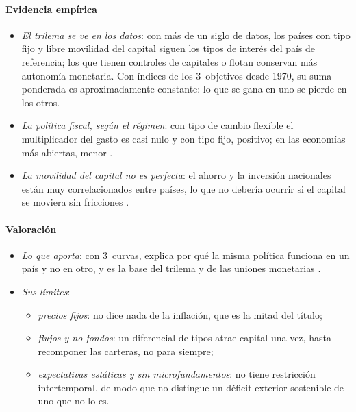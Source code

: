 \documentclass[11pt]{article}
\begin{document}
\paragraph{Evidencia empírica}

\begin{itemize}
\item \emph{El trilema se ve en los datos}: con más de un siglo de datos, los países con tipo fijo y libre movilidad del capital siguen los tipos de interés del país de referencia; los que tienen controles de capitales o flotan conservan más autonomía monetaria\nocite{ObstfeldShambaughTaylor2005}. Con índices de los 3~objetivos desde 1970, su suma ponderada es aproximadamente constante: lo que se gana en uno se pierde en los otros\nocite{AizenmanChinnIto2008}.
\item \emph{La política fiscal, según el régimen}: con tipo de cambio flexible el multiplicador del gasto es casi nulo y con tipo fijo, positivo; en las economías más abiertas, menor\nocite{IlzetzkiMendozaVegh2013} .
\item \emph{La movilidad del capital no es perfecta}: el ahorro y la inversión nacionales están muy correlacionados entre países, lo que no debería ocurrir si el capital se moviera sin fricciones\nocite{FeldsteinHorioka1980} .
\end{itemize}

\paragraph{Valoración}

\begin{itemize}
\item \emph{Lo que aporta}: con 3~curvas, explica por qué la misma política funciona en un país y no en otro, y es la base del trilema y de las uniones monetarias  .
\item \emph{Sus límites}:
  \begin{itemize}
  \item \emph{precios fijos}: no dice nada de la inflación, que es la mitad del título;
  \item \emph{flujos y no fondos}: un diferencial de tipos atrae capital una vez, hasta recomponer las carteras, no para siempre;
  \item \emph{expectativas estáticas y sin microfundamentos}: no tiene restricción intertemporal, de modo que no distingue un déficit exterior sostenible de uno que no lo es\nocite{ObstfeldRogoff1995Redux}.
  \end{itemize}
\end{itemize}
\end{document}
